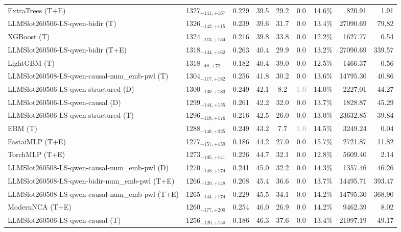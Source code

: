 \begin{tabular}{llcccccrr}
ExtraTrees (T+E) & 1327${}_{-141,+167}$ & 0.229 & 39.5 & 29.2 & 0.0 & 14.6\% & 820.91 & 1.91 \\
LLMSlot260506-LS-qwen-bidir (T) & 1326${}_{-142,+115}$ & 0.239 & 39.6 & 31.7 & 0.0 & 13.4\% & 27090.69 & 79.82 \\
XGBoost (T) & 1324${}_{-113,+134}$ & 0.216 & 39.8 & 33.8 & 0.0 & 12.2\% & 1627.77 & 0.54 \\
LLMSlot260506-LS-qwen-bidir (T+E) & 1318${}_{-134,+162}$ & 0.263 & 40.4 & 29.9 & 0.0 & 13.2\% & 27090.69 & 339.57 \\
LightGBM (T) & 1318${}_{-48,+72}$ & 0.182 & 40.4 & 39.0 & 0.0 & 12.5\% & 1466.37 & 0.56 \\
LLMSlot260508-LS-qwen-causal-num_emb-pwl (T) & 1304${}_{-117,+182}$ & 0.256 & 41.8 & 30.2 & 0.0 & 13.6\% & 14795.30 & 40.86 \\
LLMSlot260506-LS-qwen-structured (D) & 1300${}_{-139,+183}$ & 0.249 & 42.1 & 8.2 & \textcolor{silver}{\textbf{1.0}} & 14.0\% & 2227.01 & 44.27 \\
LLMSlot260506-LS-qwen-causal (D) & 1299${}_{-144,+155}$ & 0.261 & 42.2 & 32.0 & 0.0 & 13.7\% & 1828.87 & 45.29 \\
LLMSlot260506-LS-qwen-structured (T) & 1296${}_{-118,+176}$ & 0.216 & 42.5 & 26.0 & 0.0 & 13.0\% & 23632.85 & 39.84 \\
EBM (T) & 1288${}_{-146,+225}$ & 0.249 & 43.2 & 7.7 & \textcolor{silver}{\textbf{1.0}} & 14.5\% & 3249.24 & 0.04 \\
FastaiMLP (T+E) & 1277${}_{-157,+159}$ & 0.186 & 44.2 & 27.0 & 0.0 & 15.7\% & 2721.87 & 11.82 \\
TorchMLP (T+E) & 1273${}_{-105,+141}$ & 0.226 & 44.7 & 32.1 & 0.0 & 12.8\% & 5609.40 & 2.14 \\
LLMSlot260508-LS-qwen-causal-num_emb-pwl (D) & 1270${}_{-148,+174}$ & 0.241 & 45.0 & 32.2 & 0.0 & 14.3\% & 1357.46 & 46.26 \\
LLMSlot260508-LS-qwen-bidir-num_emb-pwl (T+E) & 1266${}_{-120,+148}$ & 0.208 & 45.4 & 36.6 & 0.0 & 13.7\% & 14495.71 & 393.47 \\
LLMSlot260508-LS-qwen-causal-num_emb-pwl (T+E) & 1265${}_{-144,+174}$ & 0.229 & 45.5 & 34.1 & 0.0 & 14.2\% & 14795.30 & 368.90 \\
ModernNCA (T+E) & 1260${}_{-177,+200}$ & 0.254 & 46.0 & 26.9 & 0.0 & 14.2\% & 9462.39 & 8.02 \\
LLMSlot260506-LS-qwen-causal (T) & 1256${}_{-120,+150}$ & 0.186 & 46.3 & 37.6 & 0.0 & 13.4\% & 21097.19 & 49.17 \\

\end{tabular}
